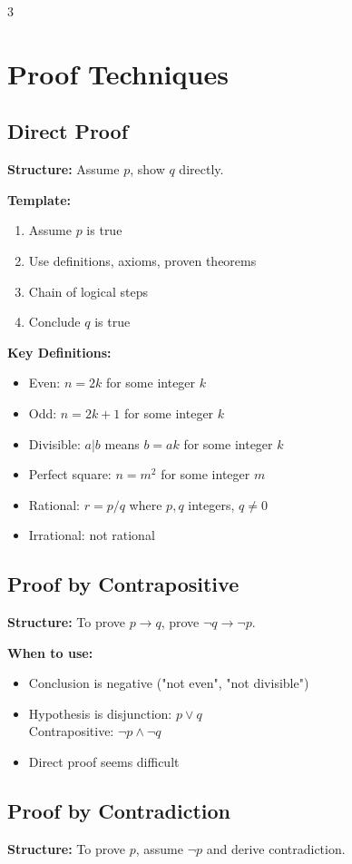 \documentclass[8pt]{article}
\begin{document}
\begin{multicols}{3}
\section*{Proof Techniques}
\subsection*{Direct Proof}
\textbf{Structure:} Assume $p$, show $q$ directly.

\textbf{Template:}
\begin{enumerate}[nosep]
\item Assume $p$ is true
\item Use definitions, axioms, proven theorems
\item Chain of logical steps
\item Conclude $q$ is true
\end{enumerate}

\textbf{Key Definitions:}
\begin{itemize}[nosep]
\item Even: $n = 2k$ for some integer $k$
\item Odd: $n = 2k+1$ for some integer $k$
\item Divisible: $a|b$ means $b = ak$ for some integer $k$
\item Perfect square: $n = m^2$ for some integer $m$
\item Rational: $r = p/q$ where $p,q$ integers, $q \neq 0$
\item Irrational: not rational
\end{itemize}

\subsection*{Proof by Contrapositive}
\textbf{Structure:} To prove $p \to q$, prove $\neg q \to \neg p$.

\textbf{When to use:}
\begin{itemize}[nosep]
\item Conclusion is negative ("not even", "not divisible")
\item Hypothesis is disjunction: $p \lor q$
  \\ Contrapositive: $\neg p \land \neg q$
\item Direct proof seems difficult
\end{itemize}


\subsection*{Proof by Contradiction}
\textbf{Structure:} To prove $p$, assume $\neg p$ and derive contradiction.


\end{multicols}
\end{document}
